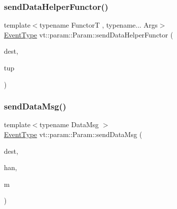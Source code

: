 \subsubsection{\texorpdfstring{send\+Data\+Helper\+Functor()}{sendDataHelperFunctor()}}
{\footnotesize\ttfamily template$<$typename FunctorT , typename... Args$>$ \\
\hyperlink{namespacevt_a009267401def7ae8bf201892222d060f}{Event\+Type} vt\+::param\+::\+Param\+::send\+Data\+Helper\+Functor (\begin{DoxyParamCaption}\item[{\hyperlink{namespacevt_a866da9d0efc19c0a1ce79e9e492f47e2}{Node\+Type} const \&}]{dest,  }\item[{std\+::tuple$<$ Args... $>$ \&\&}]{tup }\end{DoxyParamCaption})\hspace{0.3cm}{\ttfamily [inline]}}

\mbox{\label{structvt_1_1param_1_1_param_a2615b77a887582b584f2e508d7b7b8e6}} 
\subsubsection{\texorpdfstring{send\+Data\+Msg()}{sendDataMsg()}}
{\footnotesize\ttfamily template$<$typename Data\+Msg $>$ \\
\hyperlink{namespacevt_a009267401def7ae8bf201892222d060f}{Event\+Type} vt\+::param\+::\+Param\+::send\+Data\+Msg (\begin{DoxyParamCaption}\item[{\hyperlink{namespacevt_a866da9d0efc19c0a1ce79e9e492f47e2}{Node\+Type} const \&}]{dest,  }\item[{\hyperlink{namespacevt_af64846b57dfcaf104da3ef6967917573}{Handler\+Type} const \&\+\_\+\+\_\+attribute\+\_\+\+\_\+((unused))}]{han,  }\item[{\hyperlink{structvt_1_1param_1_1_data_msg}{Data\+Msg} $\ast$}]{m }\end{DoxyParamCaption})\hspace{0.3cm}{\ttfamily [inline]}}

\mbox{\label{structvt_1_1param_1_1_param_acaea25a7afac63671b36abff3c4d6e00}} 
